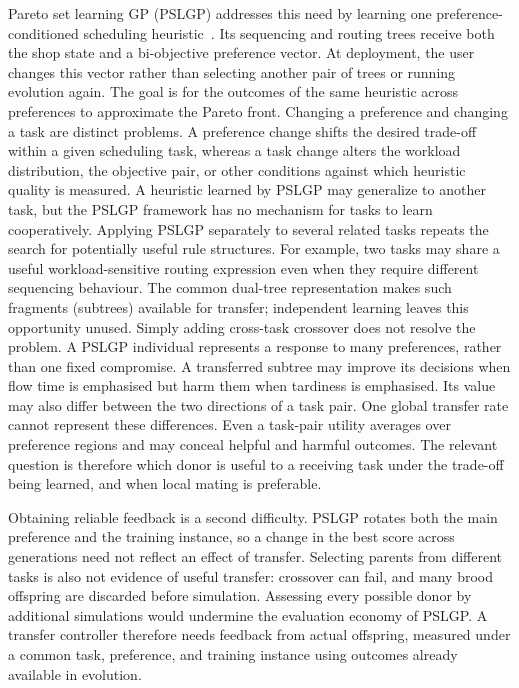 \documentclass[10pt,journal]{IEEEtran}
\begin{document}
Pareto set learning GP (PSLGP) addresses this need by learning one preference-conditioned scheduling heuristic~\cite{xu2026pslgp}. Its sequencing and routing trees receive both the shop state and a bi-objective preference vector. At deployment, the user changes this vector rather than selecting another pair of trees or running evolution again. The goal is for the outcomes of the same heuristic across preferences to approximate the Pareto front. Changing a preference and changing a task are distinct problems. A preference change shifts the desired trade-off within a given scheduling task, whereas a task change alters the workload distribution, the objective pair, or other conditions against which heuristic quality is measured. A heuristic learned by PSLGP may generalize to another task, but the PSLGP framework has no mechanism for tasks to learn cooperatively. Applying PSLGP separately to several related tasks repeats the search for potentially useful rule structures. For example, two tasks may share a useful workload-sensitive routing expression even when they require different sequencing behaviour. The common dual-tree representation makes such fragments (subtrees) available for transfer; independent learning leaves this opportunity unused.
Simply adding cross-task crossover does not resolve the problem. A PSLGP individual represents a response to many preferences, rather than one fixed compromise. A transferred subtree may improve its decisions when flow time is emphasised but harm them when tardiness is emphasised. Its value may also differ between the two directions of a task pair. One global transfer rate cannot represent these differences. Even a task-pair utility averages over preference regions and may conceal helpful and harmful outcomes. The relevant question is therefore which donor is useful to a receiving task under the trade-off being learned, and when local mating is preferable.

Obtaining reliable feedback is a second difficulty. PSLGP rotates both the main preference and the training instance, so a change in the best score across generations need not reflect an effect of transfer. Selecting parents from different tasks is also not evidence of useful transfer: crossover can fail, and many brood offspring are discarded before simulation. Assessing every possible donor by additional simulations would undermine the evaluation economy of PSLGP. A transfer controller therefore needs feedback from actual offspring, measured under a common task, preference, and training instance using outcomes already available in evolution.
\end{document}
